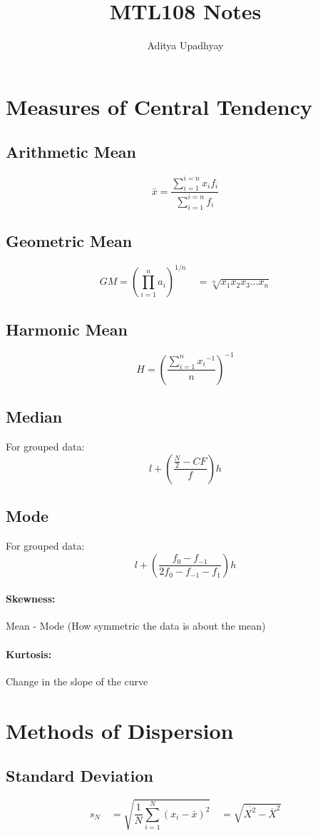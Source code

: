 \documentclass[12pt]{article}
\title{MTL108 Notes}
\author{Aditya Upadhyay}
\date{}
\begin{document}
\maketitle
\section{Measures of Central Tendency}
\subsection{Arithmetic Mean}
\[\bar{x} = \frac{ \sum_{i=1}^{i=n} {x_i}{f_i} }{\sum_{i=1}^{i=n} f_i}  \]

\subsection{Geometric Mean}
\[ GM ={\left( \prod_{i=1}^{n} a_i \right)}^{1/n} \quad = \sqrt[n]{x_1x_2x_3\dots x_n} \]

\subsection{Harmonic Mean}
\[ H= {\left( \frac{\sum_{i=1}^{n} {x_i}^{-1} }{n}\right)}^{-1}\]

\subsection{Median}
For grouped data: \[ l + \left(\frac{\frac{N}{2}-CF}{f}\right)h\]

\subsection{Mode}
For grouped data: \[   l+ \left( \frac{f_0 - f_{-1}}{2f_0 - f_{-1} - f_1} \right)h \]
\paragraph{Skewness:}
Mean - Mode    (How symmetric the data is about the mean)
\paragraph{Kurtosis:}
Change in the slope of the curve


\newpage
\section{Methods of Dispersion}
\subsection{Standard Deviation}
\[ 
s_N \quad= \sqrt{\frac{1}{N} \sum_{i=1}^{N} {(x_i - \bar{x})}^2 } \quad = \sqrt{\overline{{X}^2} - {\overline{X}}^2}
\]
\end{document}
